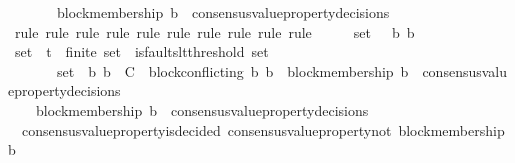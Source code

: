 \begin{isabellebody}
\ \ \ \ \ \ {\isasymlongrightarrow}\ block{\isacharunderscore}membership\ b{}\ {\isasymnotin}\ consensus{\isacharunderscore}value{\isacharunderscore}property{\isacharunderscore}decisions\ {\isasymsigma}{\isacharprime}{\isacharparenright}{\isachardoublequoteclose}\isanewline
%
\isadelimproof
\ \ %
\endisadelimproof
%
\isatagproof
{}\isamarkupfalse%
\ {\isacharparenleft}rule{\isacharcomma}\ rule{\isacharcomma}\ rule{\isacharcomma}\ rule{\isacharcomma}\ rule{\isacharcomma}\ rule{\isacharcomma}\ rule{\isacharcomma}\ rule{\isacharcomma}\ rule{\isacharcomma}\ rule{\isacharparenright}\isanewline
{}\isamarkupfalse%
\ {\isacharminus}\isanewline
\ \ \isamarkupfalse%
\ {\isasymsigma}{\isacharunderscore}set\ {\isasymsigma}\ {\isasymsigma}{\isacharprime}\ b{}\ b{}\isanewline
\ \ \ \isamarkupfalse%
\ {\isachardoublequoteopen}{\isasymsigma}{\isacharunderscore}set\ {\isasymsubseteq}\ {\isasymSigma}t{\isachardoublequoteclose}\ \ {\isachardoublequoteopen}finite\ {\isasymsigma}{\isacharunderscore}set{\isachardoublequoteclose}\ \ {\isachardoublequoteopen}is{\isacharunderscore}faults{\isacharunderscore}lt{\isacharunderscore}threshold\ {\isacharparenleft}{\isasymUnion}{\isasymsigma}{\isacharunderscore}set{\isacharparenright}{\isachardoublequoteclose}\ \isanewline
\ \ \ \ {\isachardoublequoteopen}{\isacharbraceleft}{\isasymsigma}{\isacharcomma}\ {\isasymsigma}{\isacharprime}{\isacharbraceright}\ {\isasymsubseteq}\ {\isasymsigma}{\isacharunderscore}set\ {\isasymand}\ {\isacharbraceleft}b{}{\isacharcomma}\ b{}{\isacharbraceright}\ {\isasymsubseteq}\ C\ {\isasymand}\ block{\isacharunderscore}conflicting\ {\isacharparenleft}b{}{\isacharcomma}\ b{}{\isacharparenright}\ {\isasymand}\ block{\isacharunderscore}membership\ b{}\ {\isasymin}\ consensus{\isacharunderscore}value{\isacharunderscore}property{\isacharunderscore}decisions\ {\isasymsigma}{\isachardoublequoteclose}\ \isanewline
\ \ \ \ {\isachardoublequoteopen}block{\isacharunderscore}membership\ b{}\ {\isasymin}\ consensus{\isacharunderscore}value{\isacharunderscore}property{\isacharunderscore}decisions\ {\isasymsigma}{\isacharprime}{\isachardoublequoteclose}\ \isanewline
\ \ \ \isamarkupfalse%
\ {\isachardoublequoteopen}{\isasymnot}\ consensus{\isacharunderscore}value{\isacharunderscore}property{\isacharunderscore}is{\isacharunderscore}decided\ {\isacharparenleft}consensus{\isacharunderscore}value{\isacharunderscore}property{\isacharunderscore}not\ {\isacharparenleft}block{\isacharunderscore}membership\ b{}{\isacharparenright}{\isacharcomma}\ {\isasymsigma}{\isacharprime}{\isacharparenright}{\isachardoublequoteclose}\isanewline

\end{isabellebody}
